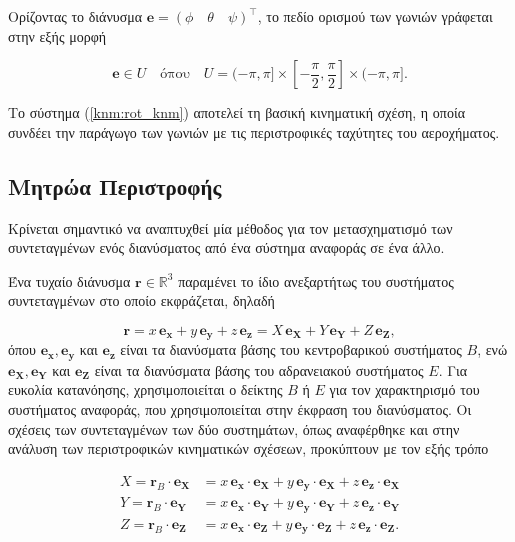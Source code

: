 Ορίζοντας το διάνυσμα \(\mathbf{e} = \left(\phi \quad \theta \quad \psi\right)
^\intercal\), το πεδίο ορισμού των γωνιών  γράφεται στην εξής μορφή

\begin{equation*}
    \mathbf{e} \in U \quad \text{όπου} \quad U = (-\pi, \pi] \times 
    \left[-\frac{\pi}{2},\frac{\pi}{2} \right] \times (-\pi, \pi].
\end{equation*}

Το σύστημα (\ref{knm:rot_knm}) αποτελεί τη βασική κινηματική σχέση, η οποία 
συνδέει την παράγωγο των γωνιών  με τις περιστροφικές ταχύτητες του 
αεροχήματος.

\subsection{Μητρώα Περιστροφής}
\noindent Κρίνεται σημαντικό να αναπτυχθεί μία μέθοδος για τον μετασχηματισμό
των συντεταγμένων ενός διανύσματος από ένα σύστημα αναφοράς σε ένα άλλο.

Ένα τυχαίο διάνυσμα \(\mathbf{r} \in \mathbb{R}^{3} \) παραμένει το ίδιο 
ανεξαρτήτως του συστήματος συντεταγμένων στο οποίο εκφράζεται, δηλαδή

\begin{equation*}
    \mathbf{r} = x\, \mathbf{e_{x}} + y\, \mathbf{e_{y}} + z\, \mathbf{e_{z}} = 
        X\, \mathbf{e_{X}} + Y\, \mathbf{e_{Y}} + Z\, \mathbf{e_{Z}},
\end{equation*}
όπου \( \mathbf{e_{x}}, \mathbf{e_{y}}\) και \(\mathbf{e_{z}}\) είναι τα 
διανύσματα βάσης του κεντροβαρικού συστήματος \(B\), ενώ \(\mathbf{e_{X}}, 
\mathbf{e_{Y}}\) και \(\mathbf{e_{Z}}\) είναι τα διανύσματα βάσης του 
αδρανειακού συστήματος \(E\). Για ευκολία κατανόησης, χρησιμοποιείται ο δείκτης 
\(B\) ή \(E\) για τον χαρακτηρισμό του συστήματος αναφοράς, που χρησιμοποιείται 
στην έκφραση του διανύσματος. Οι σχέσεις των συντεταγμένων των δύο συστημάτων, 
όπως αναφέρθηκε και στην ανάλυση των περιστροφικών κινηματικών σχέσεων, 
προκύπτουν με τον εξής τρόπο

\begin{align*}
    X = \mathbf{r}_{B} \cdot \mathbf{e_{X}} &= x\, \mathbf{e_{x}} \cdot 
        \mathbf{e_{X}} + y\, \mathbf{e_{y}} \cdot \mathbf{e_{X}} + z\, 
        \mathbf{e_{z}} \cdot \mathbf{e_{X}} \\
    Y = \mathbf{r}_{B} \cdot \mathbf{e_{Y}} &= x\, \mathbf{e_{x}} \cdot 
        \mathbf{e_{Y}} + y\, \mathbf{e_{y}} \cdot \mathbf{e_{Y}} + z\, 
        \mathbf{e_{z}} \cdot \mathbf{e_{Y}} \\
    Z = \mathbf{r}_{B} \cdot \mathbf{e_{Z}} &= x\, \mathbf{e_{x}} \cdot 
        \mathbf{e_{Z}} + y\, \mathbf{e_{y}} \cdot \mathbf{e_{Z}} + z\, 
        \mathbf{e_{z}} \cdot \mathbf{e_{Z}}.
\end{align*}

